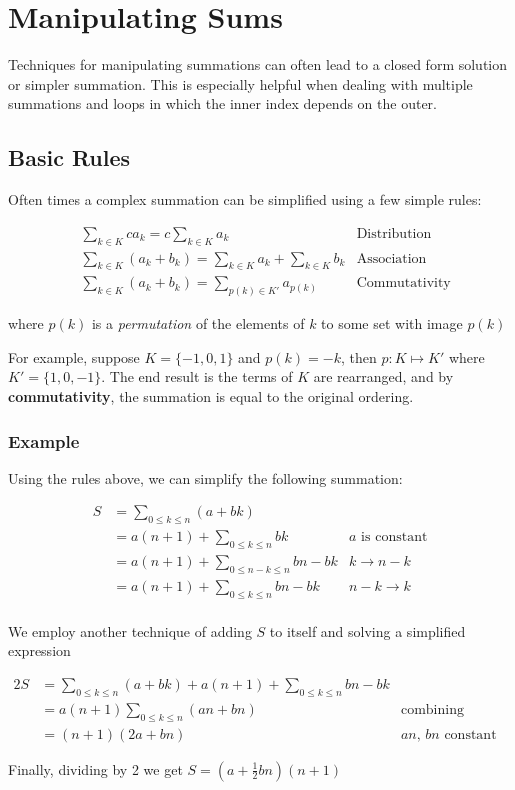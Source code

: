 \documentclass{standalone}
\begin{document}
\section{Manipulating Sums}

Techniques for manipulating summations can often lead to a closed form solution or simpler summation.
This is especially helpful when dealing with multiple summations and loops in which the inner index depends on the outer.

\subsection{Basic Rules}

Often times a complex summation can be simplified using a few simple rules:

\[
\begin{align}
  &\sum_{k \in K} c a_k = c \sum_{k \in K} a_k &\text{Distribution} \\
  &\sum_{k \in K} (a_k + b_k) = \sum_{k \in K} a_k + \sum_{k \in K} b_k &\text{Association} \\
  &\sum_{k \in K} (a_k + b_k) = \sum_{p(k) \in K'} a_{p(k)} &\text{Commutativity}
\end{align}
\]

where $p(k)$ is a \emph{permutation} of the elements of $k$ to some set with image $p(k)$

For example, suppose $K  = \{-1, 0, 1\}$ and $p(k) = -k$, then $p : K \mapsto K'$ where $K' = \{1, 0, -1\}$.
The end result is the terms of $K$ are rearranged, and by \textbf{commutativity}, the summation is equal to the original ordering.

\subsubsection{Example}

Using the rules above, we can simplify the following summation:

\[
\begin{align}
  S &= \sum_{0 \leqslant k \leqslant n} (a + bk) \\
  &= a(n+1) + \sum_{0 \leqslant k \leqslant n} bk &\text{$a$ is constant} \\
  &= a(n+1) + \sum_{0 \leqslant n-k \leqslant n} bn - bk &\text{$k \to n-k$} \\
  &= a(n+1) + \sum_{0 \leqslant k \leqslant n} bn - bk &\text{$n-k \to k$} \\
\end{align}
\]

We employ another technique of adding $S$ to itself and solving a simplified expression

\[
\begin{align}
  2S &= \sum_{0 \leqslant k \leqslant n} (a + bk) + a(n+1) + \sum_{0 \leqslant k \leqslant n} bn - bk \\
  &= a(n+1) \sum_{0 \leqslant k \leqslant n} (an + bn) &\text{combining summations and simplifying} \\
  &= (n+1)(2a + bn) &\text{$an$, $bn$ constant}
\end{align}
\]

Finally, dividing by 2 we get $S = (a + \frac 1 2 bn)(n+1)$
\end{document}

